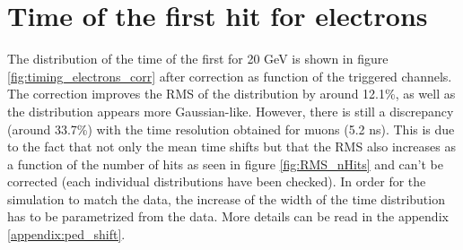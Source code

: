\section{Time of the first hit for electrons}
\label{subsec:Electron_Final}

The distribution of the time of the first for 20 GeV is shown in figure \ref{fig:timing_electrons_corr} after correction as function of the triggered channels. The correction improves the RMS of the distribution by around 12.1\%, as well as the distribution appears more Gaussian-like. However, there is still a discrepancy (around 33.7\%) with the time resolution obtained for muons (5.2 ns). This is due to the fact that not only the mean time shifts but that the RMS also increases as a function of the number of hits as seen in figure \ref{fig:RMS_nHits} and can't be corrected (each individual distributions have been checked). In order for the simulation to match the data, the increase of the width of the time distribution has to be parametrized from the data. More details can be read in the appendix \ref{appendix:ped_shift}.


